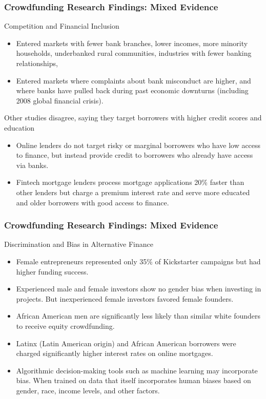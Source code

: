 \documentclass[aspectratio=169]{beamer}
\begin{document}
\begin{frame}
\frametitle{Crowdfunding Research Findings: Mixed Evidence}


Competition and Financial Inclusion
\begin{itemize}
    \item Entered markets with fewer bank branches, lower incomes, more minority households, underbanked rural communities, industries with fewer banking relationships,
    \item Entered markets where complaints about bank misconduct are higher, and where banks have pulled back during past economic downturns (including 2008 global financial crisis).
\end{itemize}

\medskip 

Other studies disagree, saying they target borrowers with higher credit scores and education
\begin{itemize}
    \item Online lenders do not target risky or marginal borrowers who have low access to finance, but instead provide credit to borrowers who already have access via banks.
    \item Fintech mortgage lenders process mortgage applications 20\% faster than other lenders but charge a premium interest rate and serve more educated and older borrowers with good access to finance.
\end{itemize}



\end{frame} 





\begin{frame}
\frametitle{Crowdfunding Research Findings: Mixed Evidence}


Discrimination and Bias in Alternative Finance
\begin{itemize}
    \item Female entrepreneurs represented only 35\% of Kickstarter campaigns but had higher funding success.
    \item Experienced male and female investors show no gender bias when investing in projects. But inexperienced female investors favored female founders.
    \item African American men are significantly less likely than similar white founders to receive equity crowdfunding.
    \item Latinx (Latin American origin) and African American borrowers were charged significantly higher interest rates on online mortgages.
    \item Algorithmic decision-making tools such as machine learning may incorporate bias. When trained on data that itself incorporates human biases based on gender, race, income levels, and other factors.
\end{itemize}



\end{frame} 
\end{document}
